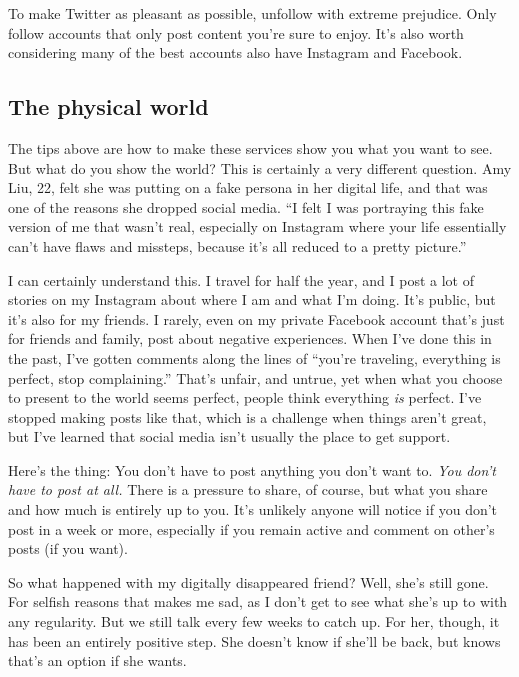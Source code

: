 To make Twitter as pleasant as possible, unfollow with extreme
prejudice. Only follow accounts that only post content you're sure to
enjoy. It's also worth considering many of the best accounts also have
Instagram and Facebook.

\hypertarget{the-physical-world}{%
\subsection{The physical world}\label{the-physical-world}}

The tips above are how to make these services show you what you want to
see. But what do you show the world? This is certainly a very different
question. Amy Liu, 22, felt she was putting on a fake persona in her
digital life, and that was one of the reasons she dropped social media.
``I felt I was portraying this fake version of me that wasn't real,
especially on Instagram where your life essentially can't have flaws and
missteps, because it's all reduced to a pretty picture.''

I can certainly understand this. I travel for half the year, and I post
a lot of stories on my Instagram about where I am and what I'm doing.
It's public, but it's also for my friends. I rarely, even on my private
Facebook account that's just for friends and family, post about negative
experiences. When I've done this in the past, I've gotten comments along
the lines of ``you're traveling, everything is perfect, stop
complaining.'' That's unfair, and untrue, yet when what you choose to
present to the world seems perfect, people think everything \emph{is}
perfect. I've stopped making posts like that, which is a challenge when
things aren't great, but I've learned that social media isn't usually
the place to get support.

Here's the thing: You don't have to post anything you don't want to.
\emph{You don't have to post at all.} There is a pressure to share, of
course, but what you share and how much is entirely up to you. It's
unlikely anyone will notice if you don't post in a week or more,
especially if you remain active and comment on other's posts (if you
want).

So what happened with my digitally disappeared friend? Well, she's still
gone. For selfish reasons that makes me sad, as I don't get to see what
she's up to with any regularity. But we still talk every few weeks to
catch up. For her, though, it has been an entirely positive step. She
doesn't know if she'll be back, but knows that's an option if she wants.

